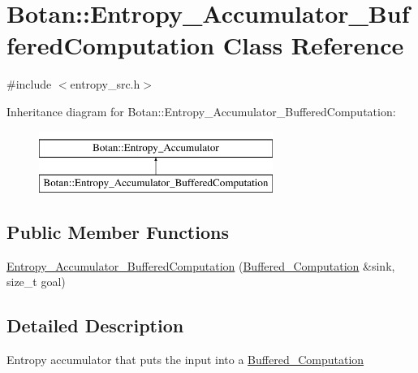 \hypertarget{classBotan_1_1Entropy__Accumulator__BufferedComputation}{\section{Botan\-:\-:Entropy\-\_\-\-Accumulator\-\_\-\-Buffered\-Computation Class Reference}
\label{classBotan_1_1Entropy__Accumulator__BufferedComputation}
}


{\ttfamily \#include $<$entropy\-\_\-src.\-h$>$}

Inheritance diagram for Botan\-:\-:Entropy\-\_\-\-Accumulator\-\_\-\-Buffered\-Computation\-:\begin{figure}[H]
\begin{center}
\leavevmode
\includegraphics[height=2.000000cm]{classBotan_1_1Entropy__Accumulator__BufferedComputation}
\end{center}
\end{figure}
\subsection*{Public Member Functions}
\begin{DoxyCompactItemize}
\item 
\hyperlink{classBotan_1_1Entropy__Accumulator__BufferedComputation_a23848c245e43c45ec5ab8f9ca7d5fe3a}{Entropy\-\_\-\-Accumulator\-\_\-\-Buffered\-Computation} (\hyperlink{classBotan_1_1Buffered__Computation}{Buffered\-\_\-\-Computation} \&sink, size\-\_\-t goal)
\end{DoxyCompactItemize}


\subsection{Detailed Description}
Entropy accumulator that puts the input into a \hyperlink{classBotan_1_1Buffered__Computation}{Buffered\-\_\-\-Computation} 


